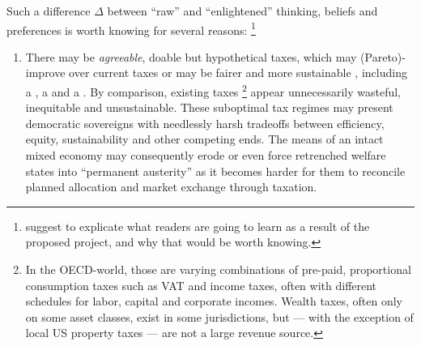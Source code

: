 Such a difference $\Delta$ between ``raw'' and ``enlightened'' thinking, %
beliefs \citep{Caplan2007} and preferences \citep{Fishkin2009} is worth knowing for several reasons:
\footnote{
	\cite{PrzeworskiSalomon1995} suggest to explicate what readers are going to learn as a result of the proposed project, and why that would be worth knowing.
}
\begin{enumerate}
	\item 
		There may be \emph{agreeable}, doable but hypothetical taxes, which may (Pareto)-improve over current taxes \citep{Harberger1974} or may be fairer \citep{Rawls-1971} and more sustainable \citep{Solow1956}, including a  \citep{Mill1848,McCaffery2002,Frank2005a,Seidman1997}, a  \citep{George1879,Buiter1988} and a  \citep{Friedman1962}.
		By comparison, existing taxes
		\footnote{
			In the \gls{OECD}-world, those are varying combinations of pre-paid, proportional consumption taxes such as \gls{VAT} and income taxes, often with different schedules for labor, capital and corporate incomes. 
			Wealth taxes, often only on some asset classes, exist in some jurisdictions, but --- with the exception of local US property taxes --- are not a large revenue source.
		}
		appear unnecessarily wasteful, inequitable and unsustainable.
		These suboptimal tax regimes may present democratic sovereigns with needlessly harsh tradeoffs between efficiency, equity, sustainability and other competing ends.
		The means of an intact mixed economy \citep{MusgThet1959,Stiglitz2011} may consequently erode or even force retrenched welfare states into ``permanent austerity'' \citep{Pierson2002,StreeckMertens2010} as it becomes harder for them to reconcile planned allocation and market exchange through taxation.
		

\end{enumerate}
